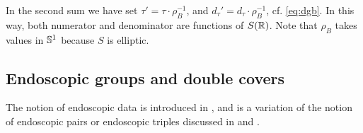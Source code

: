 \documentclass{article}
\theoremstyle{definition}
\numberwithin{equation}{section}
\renewcommand{\-}{\hyp{}}
\begin{document}
In the second sum we have set $\tau'=\tau \cdot \rho_B^{-1}$, and $d_\tau'=d_\tau \cdot \rho_B^{-1}$, cf. \eqref{eq:dgb}. In this way, both numerator and denominator are functions of $S(\mathbb{R})$. Note that $\rho_B$ takes values in $\mathbb{S}^1$ because $S$ is elliptic.



\subsection{Endoscopic groups and double covers} \label{sub:covendo}

The notion of endoscopic data is introduced in \cite[\S1.2]{LS87}, and is a variation of the notion of endoscopic pairs or endoscopic triples discussed in \cite{Kot84} and \cite{Kot86}.
\end{document}
